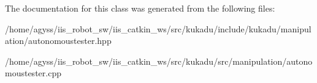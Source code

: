 The documentation for this class was generated from the following files\+:\begin{DoxyCompactItemize}
\item 
/home/agyss/iis\+\_\+robot\+\_\+sw/iis\+\_\+catkin\+\_\+ws/src/kukadu/include/kukadu/manipulation/autonomoustester.\+hpp\item 
/home/agyss/iis\+\_\+robot\+\_\+sw/iis\+\_\+catkin\+\_\+ws/src/kukadu/src/manipulation/autonomoustester.\+cpp\end{DoxyCompactItemize}
